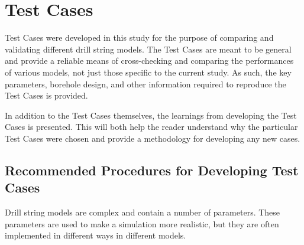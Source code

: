 \chapter{Test Cases}
\label{ch:testcases}
Test Cases were developed in this study for the purpose of comparing and validating different drill string models.  The Test Cases are meant to be general and provide a reliable means of cross-checking and comparing the performances of various models, not just those specific to the current study.  As such, the key parameters, borehole design, and other information required to reproduce the Test Cases is provided.

In addition to the Test Cases themselves, the learnings from developing the Test Cases is presented.  This will both help the reader understand why the particular Test Cases were chosen and provide a methodology for developing any new cases.

\section{Recommended Procedures for Developing Test Cases}
Drill string models are complex and contain a number of parameters.  These parameters are used to make a simulation more realistic, but they are often implemented in different ways in different models.



